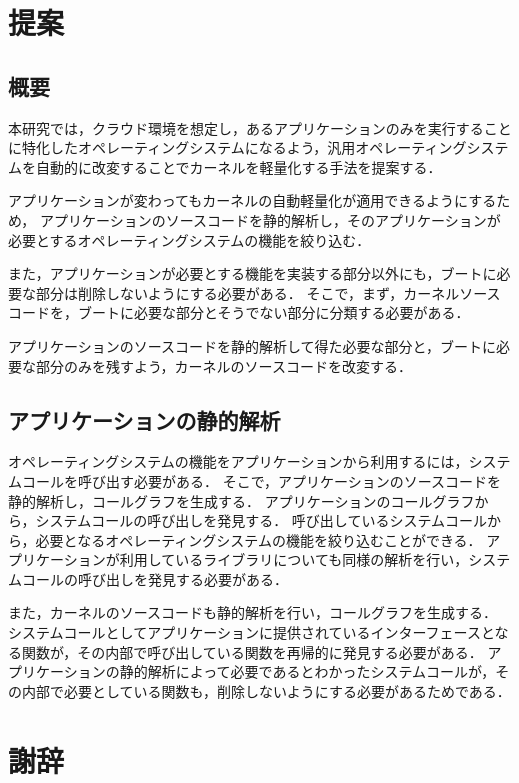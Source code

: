 \documentclass[graduation-thesis]{mlarticle}
\begin{document}


\section{提案}
\label{proposal}

\subsection{概要}
\label{proposal:abstruction}
本研究では，クラウド環境を想定し，あるアプリケーションのみを実行することに特化したオペレーティングシステムになるよう，汎用オペレーティングシステムを自動的に改変することでカーネルを軽量化する手法を提案する．

アプリケーションが変わってもカーネルの自動軽量化が適用できるようにするため，
アプリケーションのソースコードを静的解析し，そのアプリケーションが必要とするオペレーティングシステムの機能を絞り込む．

また，アプリケーションが必要とする機能を実装する部分以外にも，ブートに必要な部分は削除しないようにする必要がある．
そこで，まず，カーネルソースコードを，ブートに必要な部分とそうでない部分に分類する必要がある．

アプリケーションのソースコードを静的解析して得た必要な部分と，ブートに必要な部分のみを残すよう，カーネルのソースコードを改変する．

\subsection{アプリケーションの静的解析}
\label{proposal:static}
オペレーティングシステムの機能をアプリケーションから利用するには，システムコールを呼び出す必要がある．
そこで，アプリケーションのソースコードを静的解析し，コールグラフを生成する．
アプリケーションのコールグラフから，システムコールの呼び出しを発見する．
呼び出しているシステムコールから，必要となるオペレーティングシステムの機能を絞り込むことができる．
アプリケーションが利用しているライブラリについても同様の解析を行い，システムコールの呼び出しを発見する必要がある．

また，カーネルのソースコードも静的解析を行い，コールグラフを生成する．
システムコールとしてアプリケーションに提供されているインターフェースとなる関数が，その内部で呼び出している関数を再帰的に発見する必要がある．
アプリケーションの静的解析によって必要であるとわかったシステムコールが，その内部で必要としている関数も，削除しないようにする必要があるためである．





\clearpage
\section{謝辞}
\label{sec-8}
\clearpage



\end{document}
